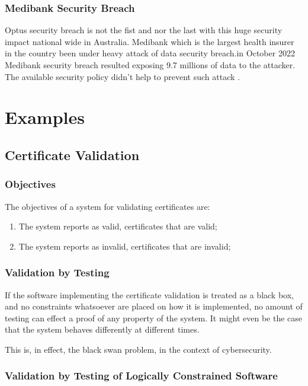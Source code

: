 \documentclass[journal]{IEEEtran}
\begin{document}
\subsubsection{Medibank Security Breach}
Optus security breach is not the fist and nor the last with this huge security impact national wide in Australia. 
Medibank which is the largest health insurer in the country been under heavy attack of data security breach.in October 
2022 Medibank security breach resulted exposing 9.7 millions of data to the attacker. The available security policy 
didn't help to prevent such attack \cite{biddle2022public}.


\section{Examples}

\subsection{Certificate Validation}

\subsubsection{Objectives}

The objectives of a system for validating certificates are:
\begin{enumerate}[CO-1]
  \item\label{validates} The system reports as valid, certificates that are valid;
  \item The system reports as invalid, certificates that are invalid;
\end{enumerate}

\subsubsection{Validation by Testing}

If the software implementing the certificate validation is treated
as a black box, and no constraints whatsoever are placed on how it is
implemented, no amount of testing can effect a proof of any
property of the system. It might even be the case that the system
behaves differently at different times.

This is, in effect, the black swan problem, in the context of cybersecurity.

\subsubsection{Validation by Testing of Logically Constrained Software}
\end{document}
